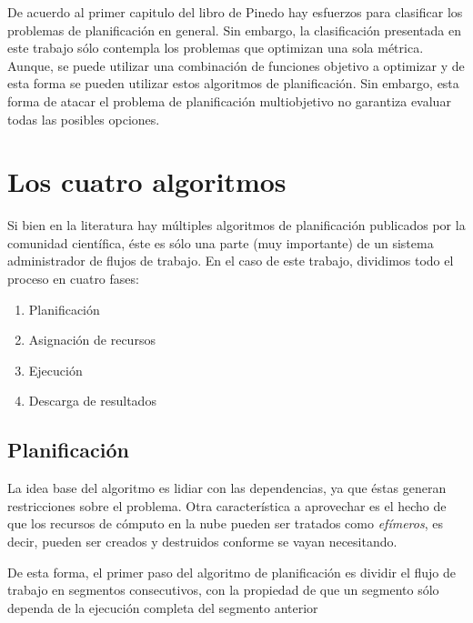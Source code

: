 De acuerdo al primer capitulo del libro de Pinedo \cite{pinedo2012scheduling} hay esfuerzos para clasificar los problemas de planificación en general. Sin embargo, la clasificación presentada en este trabajo sólo contempla los problemas que optimizan una sola métrica. Aunque, se puede utilizar una combinación de funciones objetivo a optimizar y de esta forma se pueden utilizar estos algoritmos de planificación. Sin embargo, esta forma de atacar el problema de planificación multiobjetivo no garantiza evaluar todas las posibles opciones. 



\section{Los cuatro algoritmos}

Si bien en la literatura hay múltiples algoritmos de planificación publicados por la comunidad científica, éste es sólo una parte (muy importante) de un sistema administrador de flujos de trabajo. En el caso de este trabajo, dividimos todo el proceso en cuatro fases:

\begin{enumerate}
\item{Planificación}
\item{Asignación de recursos}
\item{Ejecución}
\item{Descarga de resultados}
\end{enumerate}



\subsection{Planificación}

La idea base del algoritmo es lidiar con las dependencias, ya que éstas generan restricciones sobre el problema. Otra característica a aprovechar es el hecho de que los recursos de cómputo en la nube pueden ser tratados como \emph{efímeros}, es decir, pueden ser creados y destruidos conforme se vayan necesitando.

De esta forma, el primer paso del algoritmo de planificación es dividir el flujo de trabajo en segmentos consecutivos, con la propiedad de que un segmento sólo dependa de la ejecución completa del segmento anterior


